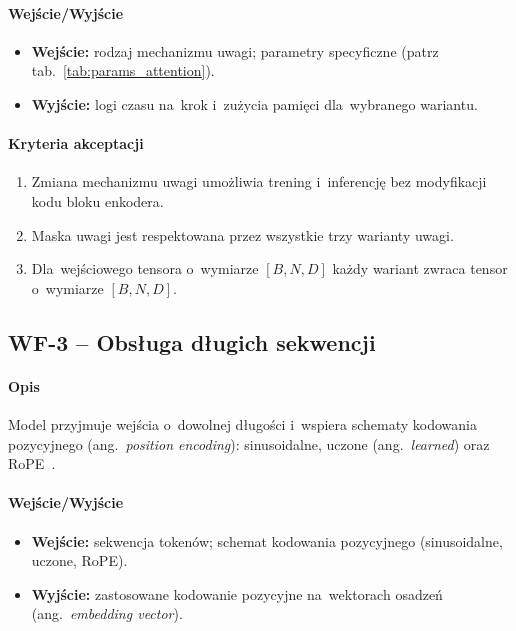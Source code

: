 \documentclass[a4paper,11pt,twoside]{report}
\theoremstyle{definition}
\begin{document}
\paragraph{Wejście/Wyjście}
\begin{itemize}
  \item \textbf{Wejście:} rodzaj mechanizmu uwagi; parametry specyficzne (patrz tab.~\ref{tab:params_attention}).
  \item \textbf{Wyjście:} logi czasu na~krok i~zużycia pamięci dla~wybranego wariantu.
\end{itemize}

\paragraph{Kryteria akceptacji}
\begin{enumerate}
  \item Zmiana mechanizmu uwagi umożliwia trening i~inferencję bez modyfikacji kodu bloku enkodera.
  \item Maska uwagi jest respektowana przez wszystkie trzy warianty uwagi.
  \item Dla~wejściowego tensora o~wymiarze $[B, N, D]$ każdy wariant zwraca tensor o~wymiarze $[B, N, D]$.
\end{enumerate}

\subsection*{WF-3 -- Obsługa długich sekwencji}
\paragraph{Opis} Model przyjmuje wejścia o~dowolnej długości i~wspiera schematy kodowania pozycyjnego (ang.\ \emph{position encoding}): sinusoidalne, uczone (ang.\ \emph{learned}) oraz RoPE~\cite{SU2024127063}.

\paragraph{Wejście/Wyjście}
\begin{itemize}
  \item \textbf{Wejście:} sekwencja tokenów; schemat kodowania pozycyjnego (sinusoidalne, uczone, RoPE).
  \item \textbf{Wyjście:} zastosowane kodowanie pozycyjne na~wektorach osadzeń (ang.\ \emph{embedding vector}).
\end{itemize}
\end{document}
